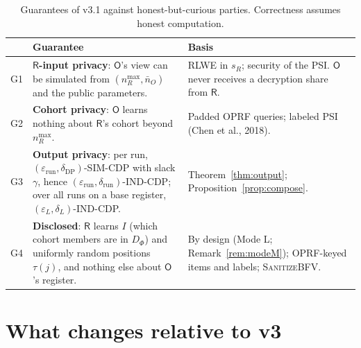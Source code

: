 \documentclass[11pt]{article}
\theoremstyle{definition}
\theoremstyle{plain}
\newcommand{\Rp}{\mathsf{R}}
\newcommand{\Op}{\mathsf{O}}
\begin{document}
\begin{table}[h]
\centering\small
\begin{tabularx}{\textwidth}{@{}l>{\raggedright\arraybackslash}X>{\raggedright\arraybackslash}X@{}}
\toprule
 & Guarantee & Basis \\
\midrule
G1 & \textbf{$\Rp$-input privacy}: $\Op$'s view can be simulated from $(n_R^{\max},\bar n_O)$ and the public parameters. & RLWE in $s_R$; security of the PSI. $\Op$ never receives a decryption share from $\Rp$. \\
G2 & \textbf{Cohort privacy}: $\Op$ learns nothing about $\Rp$'s cohort beyond $n_R^{\max}$. & Padded OPRF queries; labeled PSI (Chen et al., 2018). \\
G3 & \textbf{Output privacy}: per run, $(\varepsilon_{\mathrm{run}},\delta_{\mathrm{DP}})$-SIM-CDP with slack $\gamma$, hence $(\varepsilon_{\mathrm{run}},\delta_{\mathrm{run}})$-IND-CDP; over all runs on a base register, $(\varepsilon_L,\delta_L)$-IND-CDP. & Theorem~\ref{thm:output}; Proposition~\ref{prop:compose}. \\
G4 & \textbf{Disclosed}: $\Rp$ learns $I$ (which cohort members are in $D_\Phi$) and uniformly random positions $\tau(j)$, and nothing else about $\Op$'s register. & By design (Mode L; Remark~\ref{rem:modeM}); OPRF-keyed items and labels; \textsc{SanitizeBFV}. \\
\bottomrule
\end{tabularx}
\caption{Guarantees of v3.1 against honest-but-curious parties. Correctness assumes honest computation.}
\label{tab:guarantees}
\end{table}

\section{What changes relative to v3}
\label{sec:changes}
\end{document}
